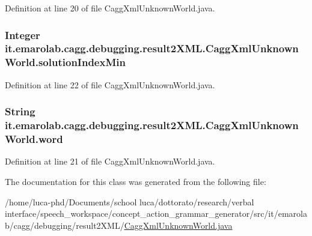 Definition at line 20 of file Cagg\-Xml\-Unknown\-World.\-java.

\hypertarget{classit_1_1emarolab_1_1cagg_1_1debugging_1_1result2XML_1_1CaggXmlUnknownWorld_ae0d33ee2fe46320439eba9d0ea0450d5}{
\subsubsection[{solution\-Index\-Min}]{\setlength{\rightskip}{0pt plus 5cm}Integer it.\-emarolab.\-cagg.\-debugging.\-result2\-X\-M\-L.\-Cagg\-Xml\-Unknown\-World.\-solution\-Index\-Min\hspace{0.3cm}{\ttfamily [private]}}}\label{classit_1_1emarolab_1_1cagg_1_1debugging_1_1result2XML_1_1CaggXmlUnknownWorld_ae0d33ee2fe46320439eba9d0ea0450d5}


Definition at line 22 of file Cagg\-Xml\-Unknown\-World.\-java.

\hypertarget{classit_1_1emarolab_1_1cagg_1_1debugging_1_1result2XML_1_1CaggXmlUnknownWorld_a26bce6329474f319129e5c3624741075}{
\subsubsection[{word}]{\setlength{\rightskip}{0pt plus 5cm}String it.\-emarolab.\-cagg.\-debugging.\-result2\-X\-M\-L.\-Cagg\-Xml\-Unknown\-World.\-word\hspace{0.3cm}{\ttfamily [private]}}}\label{classit_1_1emarolab_1_1cagg_1_1debugging_1_1result2XML_1_1CaggXmlUnknownWorld_a26bce6329474f319129e5c3624741075}


Definition at line 21 of file Cagg\-Xml\-Unknown\-World.\-java.



The documentation for this class was generated from the following file\-:\begin{DoxyCompactItemize}
\item 
/home/luca-\/phd/\-Documents/school luca/dottorato/research/verbal interface/speech\-\_\-workspace/concept\-\_\-action\-\_\-grammar\-\_\-generator/src/it/emarolab/cagg/debugging/result2\-X\-M\-L/\hyperlink{CaggXmlUnknownWorld_8java}{Cagg\-Xml\-Unknown\-World.\-java}\end{DoxyCompactItemize}
